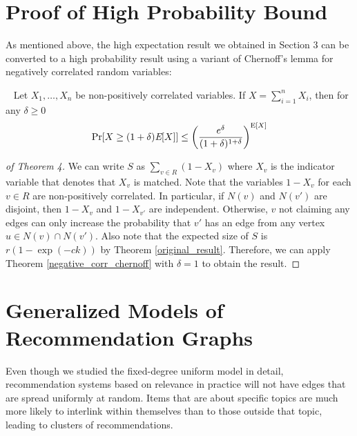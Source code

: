\appendix

\section{Proof of High Probability Bound}
As mentioned above, the high expectation result we obtained in Section 3 can be converted to a high probability result using a variant of Chernoff's lemma for negatively correlated random variables:

\begin{thm}\label{negative_corr_chernoff}~\cite{AugerDoerr2011}
Let $X_1,\ldots, X_n$ be non-positively correlated variables. If $X=\sum_{i=1}^n X_i$, then for any $\delta\geq 0$
\[ \Pr[X \geq (1+\delta)\emph{\text{E}}[X] ] \leq \left(\frac{e^\delta}{(1+\delta)^{1+\delta}}\right)^{\text{E}[X]} \]
\end{thm}

\begin{proof}[of Theorem 4]
We can write $S$ as $\sum_{v\in R} (1-X_v)$ where $X_v$ is the indicator
variable that denotes that $X_v$ is matched. Note that the variables
$1-X_v$ for each $v\in R$ are non-positively correlated. In
particular, if $N(v)$ and $N(v')$ are disjoint, then $1-X_v$ and
$1-X_{v'}$ are independent. Otherwise, $v$ not claiming any edges can
only increase the probability that $v'$ has an edge from any vertex
$u\in N(v)\cap N(v')$. Also note that the expected size of $S$ is
$r(1-\exp(-ck))$ by Theorem \ref{original_result}. Therefore, we can
apply Theorem \ref{negative_corr_chernoff} with $\delta=1$ to obtain
the result.
\end{proof}

\section{Generalized Models of Recommendation Graphs}
Even though we studied the fixed-degree uniform model in detail,
recommendation systems based on relevance in practice
 will not have
edges that are spread uniformly at random. Items that are
 about
specific topics are much more likely to interlink within
 themselves
than to those outside that topic, leading to
 clusters of
recommendations.
 
